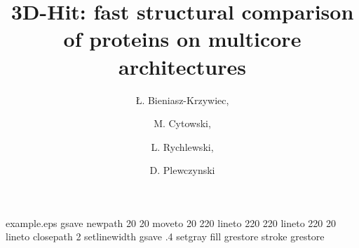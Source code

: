 %
%
%
%
%
\begin{filecontents*}{example.eps}
gsave
newpath
  20 20 moveto
  20 220 lineto
  220 220 lineto
  220 20 lineto
closepath
2 setlinewidth
gsave
  .4 setgray fill
grestore
stroke
grestore
\end{filecontents*}
%
\RequirePackage{fix-cm}
%
\documentclass[smallextended]{svjour3}       %
%
\smartqed  %
%
\usepackage{graphicx}
%
%
%
%
\usepackage[latin1]{inputenc}
\usepackage[T1]{fontenc}
\usepackage[bottom]{footmisc}
\usepackage{algorithmic}
\usepackage{algorithm}

\newcommand{\icm}{ICM}
\newcommand{\ibm}{IBM}
\newcommand{\prog}{\emph{3DHit}}






\title{3D-Hit: fast structural comparison of proteins on multicore architectures}
\label{DPlewczynski} %


\author{\L{}. Bieniasz-Krzywiec, \and 
M. Cytowski, \and 
L. Rychlewski, \and
D. Plewczynski       
}

